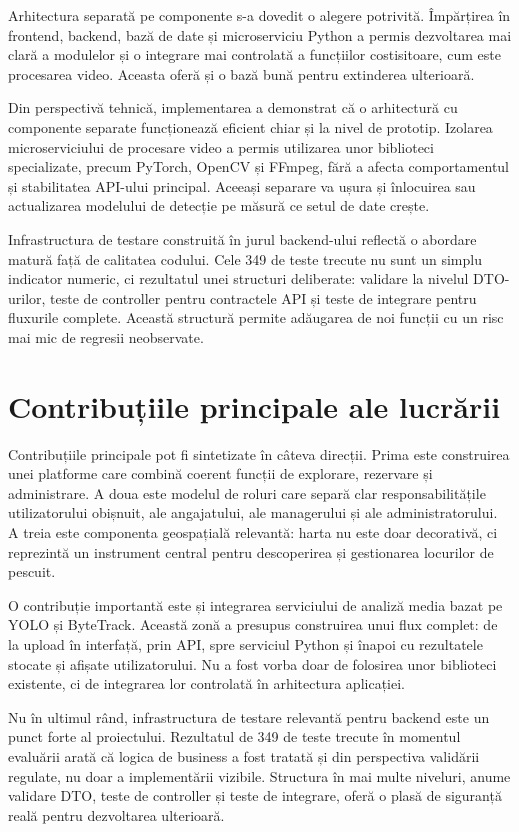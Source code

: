 Arhitectura separată pe componente s-a dovedit o alegere potrivită. Împărțirea în frontend, backend, bază de date și microserviciu Python a permis dezvoltarea mai clară a modulelor și o integrare mai controlată a funcțiilor costisitoare, cum este procesarea video. Aceasta oferă și o bază bună pentru extinderea ulterioară.

Din perspectivă tehnică, implementarea a demonstrat că o arhitectură cu componente separate funcționează eficient chiar și la nivel de prototip. Izolarea microserviciului de procesare video a permis utilizarea unor biblioteci specializate, precum PyTorch, OpenCV și FFmpeg, fără a afecta comportamentul și stabilitatea API-ului principal. Aceeași separare va ușura și înlocuirea sau actualizarea modelului de detecție pe măsură ce setul de date crește.

Infrastructura de testare construită în jurul backend-ului reflectă o abordare matură față de calitatea codului. Cele 349 de teste trecute nu sunt un simplu indicator numeric, ci rezultatul unei structuri deliberate: validare la nivelul DTO-urilor, teste de controller pentru contractele API și teste de integrare pentru fluxurile complete. Această structură permite adăugarea de noi funcții cu un risc mai mic de regresii neobservate.

\section{Contribuțiile principale ale lucrării}

Contribuțiile principale pot fi sintetizate în câteva direcții. Prima este construirea unei platforme care combină coerent funcții de explorare, rezervare și administrare. A doua este modelul de roluri care separă clar responsabilitățile utilizatorului obișnuit, ale angajatului, ale managerului și ale administratorului. A treia este componenta geospațială relevantă: harta nu este doar decorativă, ci reprezintă un instrument central pentru descoperirea și gestionarea locurilor de pescuit.

O contribuție importantă este și integrarea serviciului de analiză media bazat pe YOLO și ByteTrack. Această zonă a presupus construirea unui flux complet: de la upload în interfață, prin API, spre serviciul Python și înapoi cu rezultatele stocate și afișate utilizatorului. Nu a fost vorba doar de folosirea unor biblioteci existente, ci de integrarea lor controlată în arhitectura aplicației.

Nu în ultimul rând, infrastructura de testare relevantă pentru backend este un punct forte al proiectului. Rezultatul de 349 de teste trecute în momentul evaluării arată că logica de business a fost tratată și din perspectiva validării regulate, nu doar a implementării vizibile. Structura în mai multe niveluri, anume validare DTO, teste de controller și teste de integrare, oferă o plasă de siguranță reală pentru dezvoltarea ulterioară.

